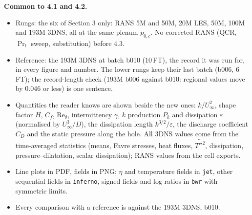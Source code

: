 \documentclass[10pt]{article}
\begin{document}
\textbf{Common to 4.1 and 4.2.}
\begin{itemize}
\item Rungs: the six of Section 3 only: RANS 5M and 50M, 20M LES, 50M, 100M and 193M 3DNS, all at the same
  plenum $p_{0,c}$. No corrected RANS (QCR, $\Pr_t$ sweep, substitution) before 4.3.
\item Reference: the 193M 3DNS at batch b010 (10\,FT), the record it was run for, in every figure and number.
  The lower rungs keep their last batch (b006, 6\,FT); the record-length check (193M b006 against b010: regional
  values move by 0.046 or less) is one sentence.
\item Quantities the reader knows are shown beside the new ones: $k/U_\infty^2$, shape factor $H$, $C_f$,
  $\mathrm{Re}_\theta$, intermittency $\gamma$, $k$ production $P_k$ and dissipation $\varepsilon$ (normalised by
  $U_\infty^3/D$), the dissipation length $k^{3/2}/\varepsilon$, the discharge coefficient $C_D$ and the static
  pressure along the hole. All 3DNS values come from the time-averaged statistics (means, Favre stresses, heat
  fluxes, $\widetilde{T''^2}$, dissipation, pressure--dilatation, scalar dissipation); RANS values from the cell
  exports.
\item Line plots in PDF, fields in PNG; $\eta$ and temperature fields in \texttt{jet}, other sequential fields in
  \texttt{inferno}, signed fields and log ratios in \texttt{bwr} with symmetric limits.
\item Every comparison with a reference is against the 193M 3DNS, b010.
\end{itemize}
\end{document}
